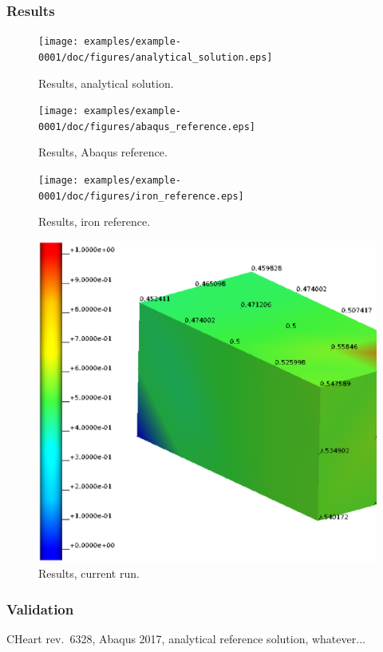 \subsubsection{Results}
%
\begin{figure}[h!]
    \centering 
    \texttt{[image: examples/example-0001/doc/figures/analytical\_solution.eps]} 
    \caption{Results, analytical solution.}
    \label{example-0001-analytical-solution-fig}
\end{figure}
%
\begin{figure}[h!]
    \centering 
    \texttt{[image: examples/example-0001/doc/figures/abaqus\_reference.eps]} 
    \caption{Results, Abaqus reference.}
    \label{example-0001-abaqus-reference-fig}
\end{figure}
%
\begin{figure}[h!]
    \centering 
    \texttt{[image: examples/example-0001/doc/figures/iron\_reference.eps]} 
    \caption{Results, iron reference.}
    \label{example-0001-iron-reference-fig}
\end{figure}
%
\begin{figure}[h!]
    \centering 
    \includegraphics[width=\columnwidth]{examples/example-0001/doc/figures/current_run.eps} 
    \caption{Results, current run.}
    \label{example-0001-current-run-fig}
\end{figure}
%
%
\subsubsection{Validation}
%
CHeart rev.\ 6328, Abaqus 2017, analytical reference solution, whatever...
%
